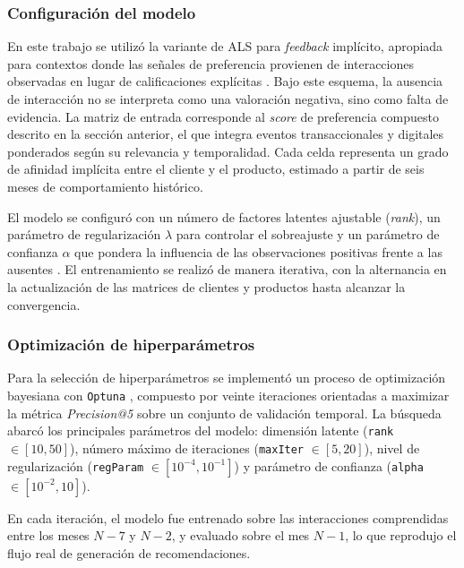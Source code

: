 \subsubsection{Configuración del modelo}

En este trabajo se utilizó la variante de ALS para \textit{feedback} implícito, apropiada para contextos donde las señales de preferencia provienen de interacciones observadas en lugar de calificaciones explícitas \cite{ARTICLE:Hu2008}. Bajo este esquema, la ausencia de interacción no se interpreta como una valoración negativa, sino como falta de evidencia. La matriz de entrada corresponde al \textit{score} de preferencia compuesto descrito en la sección anterior, el que integra eventos transaccionales y digitales ponderados según su relevancia y temporalidad. Cada celda representa un grado de afinidad implícita entre el cliente y el producto, estimado a partir de seis meses de comportamiento histórico.

El modelo se configuró con un número de factores latentes ajustable (\textit{rank}), un parámetro de regularización $\lambda$ para controlar el sobreajuste y un parámetro de confianza $\alpha$ que pondera la influencia de las observaciones positivas frente a las ausentes \cite{ARTICLE:Hu2008}. El entrenamiento se realizó de manera iterativa, con la alternancia en la actualización de las matrices de clientes y productos hasta alcanzar la convergencia.

\subsubsection{Optimización de hiperparámetros}

Para la selección de hiperparámetros se implementó un proceso de optimización bayesiana con \texttt{Optuna} \cite{ARTICLE:Akiba2019}, compuesto por veinte iteraciones orientadas a maximizar la métrica \textit{Precision@5} sobre un conjunto de validación temporal. La búsqueda abarcó los principales parámetros del modelo: dimensión latente (\texttt{rank} $\in [10, 50]$), número máximo de iteraciones (\texttt{maxIter} $\in [5, 20]$), nivel de regularización (\texttt{regParam} $\in [10^{-4}, 10^{-1}]$) y parámetro de confianza (\texttt{alpha} $\in [10^{-2}, 10]$). 

En cada iteración, el modelo fue entrenado sobre las interacciones comprendidas entre los meses $N-7$ y $N-2$, y evaluado sobre el mes $N-1$, lo que reprodujo el flujo real de generación de recomendaciones.


